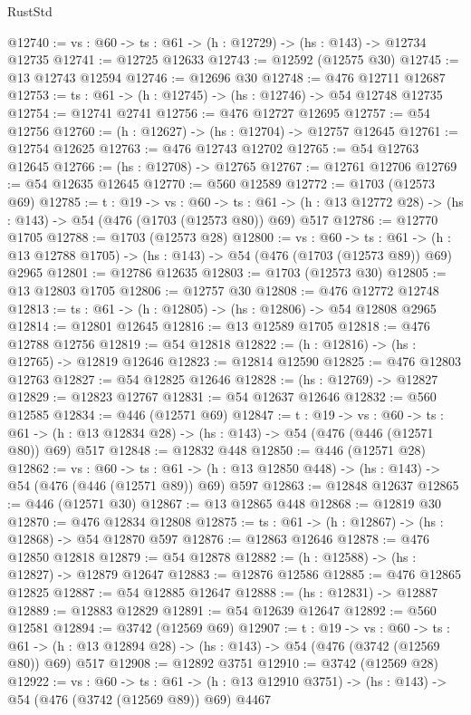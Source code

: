 \begin{lexlean}{RustStd}
\begin{coremodule}
@12740 := {vs : @60} -> {ts : @61} -> (h : @12729) -> (hs : @143) -> @12734 @12735
@12741 := @12725 @12633
@12743 := @12592 (@12575 @30)
@12745 := @13 @12743 @12594
@12746 := @12696 @30
@12748 := @476 @12711 @12687
@12753 := {ts : @61} -> (h : @12745) -> (hs : @12746) -> @54 @12748 @12735
@12754 := @12741 @2741
@12756 := @476 @12727 @12695
@12757 := @54 @12756
@12760 := (h : @12627) -> (hs : @12704) -> @12757 @12645
@12761 := @12754 @12625
@12763 := @476 @12743 @12702
@12765 := @54 @12763 @12645
@12766 := (hs : @12708) -> @12765
@12767 := @12761 @12706
@12769 := @54 @12635 @12645
@12770 := @560 @12589
@12772 := @1703 (@12573 @69)
@12785 := {t : @19} ->
  {vs : @60} ->
  {ts : @61} -> (h : @13 @12772 @28) -> (hs : @143) -> @54 (@476 (@1703 (@12573 @80)) @69) @517
@12786 := @12770 @1705
@12788 := @1703 (@12573 @28)
@12800 := {vs : @60} ->
  {ts : @61} -> (h : @13 @12788 @1705) -> (hs : @143) -> @54 (@476 (@1703 (@12573 @89)) @69) @2965
@12801 := @12786 @12635
@12803 := @1703 (@12573 @30)
@12805 := @13 @12803 @1705
@12806 := @12757 @30
@12808 := @476 @12772 @12748
@12813 := {ts : @61} -> (h : @12805) -> (hs : @12806) -> @54 @12808 @2965
@12814 := @12801 @12645
@12816 := @13 @12589 @1705
@12818 := @476 @12788 @12756
@12819 := @54 @12818
@12822 := (h : @12816) -> (hs : @12765) -> @12819 @12646
@12823 := @12814 @12590
@12825 := @476 @12803 @12763
@12827 := @54 @12825 @12646
@12828 := (hs : @12769) -> @12827
@12829 := @12823 @12767
@12831 := @54 @12637 @12646
@12832 := @560 @12585
@12834 := @446 (@12571 @69)
@12847 := {t : @19} ->
  {vs : @60} ->
  {ts : @61} -> (h : @13 @12834 @28) -> (hs : @143) -> @54 (@476 (@446 (@12571 @80)) @69) @517
@12848 := @12832 @448
@12850 := @446 (@12571 @28)
@12862 := {vs : @60} ->
  {ts : @61} -> (h : @13 @12850 @448) -> (hs : @143) -> @54 (@476 (@446 (@12571 @89)) @69) @597
@12863 := @12848 @12637
@12865 := @446 (@12571 @30)
@12867 := @13 @12865 @448
@12868 := @12819 @30
@12870 := @476 @12834 @12808
@12875 := {ts : @61} -> (h : @12867) -> (hs : @12868) -> @54 @12870 @597
@12876 := @12863 @12646
@12878 := @476 @12850 @12818
@12879 := @54 @12878
@12882 := (h : @12588) -> (hs : @12827) -> @12879 @12647
@12883 := @12876 @12586
@12885 := @476 @12865 @12825
@12887 := @54 @12885 @12647
@12888 := (hs : @12831) -> @12887
@12889 := @12883 @12829
@12891 := @54 @12639 @12647
@12892 := @560 @12581
@12894 := @3742 (@12569 @69)
@12907 := {t : @19} ->
  {vs : @60} ->
  {ts : @61} -> (h : @13 @12894 @28) -> (hs : @143) -> @54 (@476 (@3742 (@12569 @80)) @69) @517
@12908 := @12892 @3751
@12910 := @3742 (@12569 @28)
@12922 := {vs : @60} ->
  {ts : @61} -> (h : @13 @12910 @3751) -> (hs : @143) -> @54 (@476 (@3742 (@12569 @89)) @69) @4467

\end{coremodule}
\end{lexlean}
